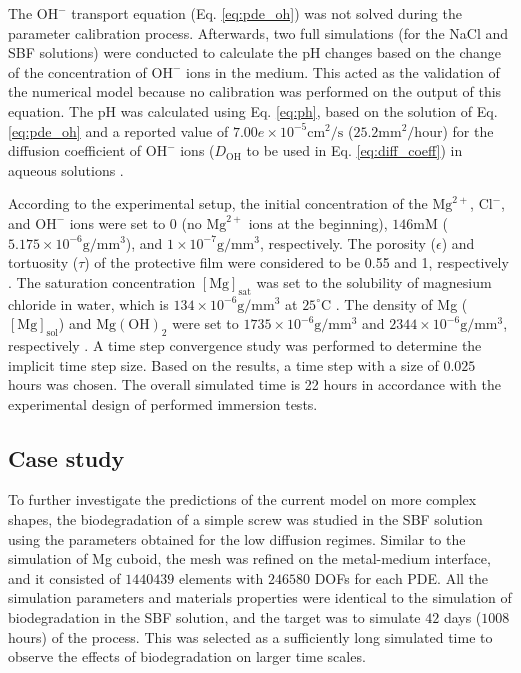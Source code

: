 The $\mathrm{OH}^{-}$ transport equation (Eq. \ref{eq:pde_oh}) was not solved during the parameter calibration process. Afterwards, two full simulations (for the NaCl and SBF solutions) were conducted to calculate the pH changes based on the change of the concentration of $\mathrm{OH}^{-}$ ions in the medium. This acted as the validation of the numerical model because no calibration was performed on the output of this equation. The pH was calculated using Eq. \ref{eq:ph}, based on the solution of Eq. \ref{eq:pde_oh} and a reported value of $7.00e\times10^{-5} \mathrm{cm}^2/\mathrm{s}$ ($25.2 \mathrm{mm}^2/\mathrm{hour}$) for the diffusion coefficient of $\mathrm{OH}^{-}$ ions ($D_{\mathrm{OH}}$ to be used in Eq. \ref{eq:diff_coeff}) in aqueous solutions \cite{Lee2011}.

According to the experimental setup, the initial concentration of the $\mathrm{Mg}^{2+}$, $\mathrm{Cl}^{-}$, and $\mathrm{OH}^{-}$ ions were set to 0 (no $\mathrm{Mg}^{2+}$ ions at the beginning), $146 \mathrm{mM}$ ($5.175\times10^{-6} \mathrm{g}/\mathrm{mm}^3$), and $1\times10^{-7} \mathrm{g}/\mathrm{mm}^3$, respectively. The porosity ($\epsilon$) and tortuosity ($\tau$) of the protective film were considered to be 0.55 and 1, respectively \cite{Sun2012}. The saturation concentration $[\mathrm{Mg}]_{\mathrm{sat}}$ was set to the solubility of magnesium chloride in water, which is $134\times10^{-6}\mathrm{g}/\mathrm{mm}^3$ at $25^{\circ}\mathrm{C}$ \cite{GrahamC.Hill2001}. The density of Mg ($[\mathrm{Mg}]_{\mathrm{sol}}$) and $\mathrm{Mg(OH)}_2$ were set to $1735\times10^{-6}\mathrm{g}/\mathrm{mm}^3$ and $2344\times10^{-6}\mathrm{g}/\mathrm{mm}^3$, respectively \cite{Bajger2016}. A time step convergence study was performed to determine the implicit time step size. Based on the results, a time step with a size of $0.025$ hours was chosen. The overall simulated time is 22 hours in accordance with the experimental design of performed immersion tests.

\subsection{Case study}

To further investigate the predictions of the current model on more complex shapes, the biodegradation of a simple screw was studied in the SBF solution using the parameters obtained for the low diffusion regimes. Similar to the simulation of Mg cuboid, the mesh was refined on the metal-medium interface, and it consisted of $\num{1440439}$ elements with $\num{246580}$ DOFs for each PDE. All the simulation parameters and materials properties were identical to the simulation of biodegradation in the SBF solution, and the target was to simulate $42$ days ($1008$ hours) of the process. This was selected as a sufficiently long simulated time to observe the effects of biodegradation on larger time scales.

